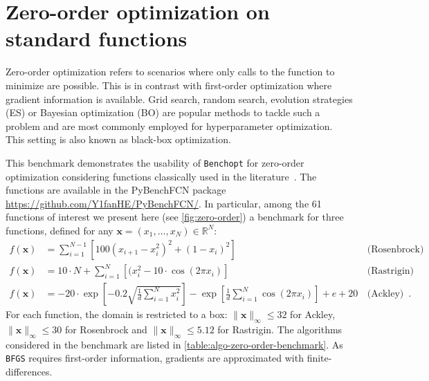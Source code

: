 \documentclass{article}
\newcommand{\rebuttal}[1]{#1}
\newcommand{\Benchopt}{{{\texttt{Benchopt}}}}
\begin{document}
\clearpage{}

\clearpage{}\section{\rebuttal{Zero-order optimization on standard functions}}\label{sec:app:zero-order}


\rebuttal{Zero-order optimization refers to scenarios where only calls to the function to minimize are possible. This is in contrast with first-order optimization where gradient information is available. Grid search, random search, evolution strategies (ES) or Bayesian optimization (BO) are popular methods to tackle such a problem and are most commonly employed for hyperparameter optimization. This setting is also known as black-box optimization.}

\rebuttal{This benchmark demonstrates the usability of \Benchopt{} for zero-order optimization considering functions classically used in the literature~\citep{hansen:hal-01294124}. The functions are available in the PyBenchFCN package \url{https://github.com/Y1fanHE/PyBenchFCN/}. In particular, among the 61 functions of interest we present here (see \autoref{fig:zero-order}) a benchmark for three functions, defined for  any $\mathbf {x} =(x_{1},\ldots ,x_{N})\in \mathbb {R} ^{N}$:
\begin{align*}
    f(\mathbf {x} ) & = \sum _{i=1}^{N-1}[100(x_{i+1}-x_{i}^{2})^{2}+(1-x_{i})^{2}] \, &  \text{(Rosenbrock)} \\
    f(\mathbf {x} ) & = 10 \cdot N + \sum _{i=1}^{N}[(x_{i}^2-10\cdot \cos(2\pi x_i)]
    \, &\text{(Rastrigin)} \\
    f(\mathbf {x} ) & = -20 \cdot \exp \left[-0.2 {\sqrt {\frac{1}{d}\sum_{i=1}^N x_i^2}}\right] -\exp \left[  {\frac{1}{d}\sum_{i=1}^N \cos(2\pi x_i)}\right]+e+20\, & \text{(Ackley)}
    \enspace.
\end{align*}
For each function, the domain is restricted to a box: $\|\mathbf{x}\|_\infty \leq 32$ for Ackley, $\|\mathbf{x}\|_\infty \leq 30$ for Rosenbrock and $\|\mathbf{x}\|_\infty \leq 5.12$ for Rastrigin.
The algorithms considered in the benchmark are listed in
\autoref{table:algo-zero-order-benchmark}. As \texttt{BFGS} requires first-order information, gradients are approximated with finite-differences.}
\end{document}
